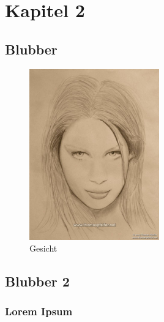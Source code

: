 \section{Kapitel 2}
\label{sec:Kapitel2}

\subsection{Blubber}
\label{sec:Blubber}

\lipsum[1-3]

\begin{figure}[h]
	\centering
		\includegraphics[width=0.50\textwidth]{bilder.jpg}
	\caption{Gesicht}
	\label{fig:bilder}
\end{figure}

\subsection{Blubber 2}
\label{sec:Blubber2}

\subsubsection{Lorem Ipsum}
\label{sec:LoremIpsum}

\lipsum[1-5]
